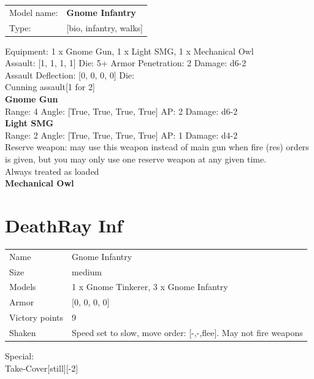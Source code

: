 \begin{tabular}{ll}
Model name: & {\bf Gnome Infantry } \\
Type: & [bio, infantry, walks] \\
\end{tabular}

Equipment: 1 x Gnome Gun, 1 x Light SMG, 1 x Mechanical Owl \\

Assault: [1, 1, 1, 1] Die: 5+ Armor Penetration: 2 Damage: d6-2 \\
Assault Deflection: [0, 0, 0, 0] Die: \\
\indent Cunning assault[1 for 2]\\ 
 



{\bf Gnome Gun } \\



Range: 4  Angle: [True, True, True, True] AP: 2 Damage: d6-2 \\




{\bf Light SMG } \\



Range: 2  Angle: [True, True, True, True] AP: 1 Damage: d4-2 \\
Reserve weapon: may use this weapon instead of main gun when fire (res) orders is given, but you may only use one reserve weapon at any given time.\\ 
Always treated as loaded\\ 




{\bf Mechanical Owl } \\






 















\clearpage

\section{ DeathRay Inf }

\begin{tabular}{ll}
  Name & Gnome Infantry \\
  Size & medium\\
  Models & 1 x Gnome Tinkerer, 3 x Gnome Infantry\\
  Armor & [0, 0, 0, 0]\\
  Victory points & 9\\
  Shaken & Speed set to slow, move order: [-,-,flee]. May not fire weapons\\
\end{tabular}
Special: \\
Take-Cover[still][-2]\\ 



